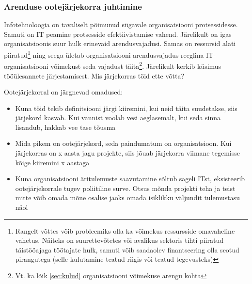 \documentclass{article}
\begin{document}
\subsubsection{Arenduse ootejärjekorra juhtimine}
Infotehnoloogia on tavaliselt põimunud sügavale organisatsiooni protsessidesse. Samuti on IT peamine protsesside efektiivistamise vahend. Järelikult on igas organisatsioonis suur hulk erinevaid arendusvajadusi. Samas on ressursid alati piiratud\footnote{Rangelt võttes võib probleemiks olla ka võimekus ressursside omavaheline vahetus. Näiteks on suurettevõtetes või avalikus sektoris tihti piiratud täistööajaga töötajate hulk, samuti võib saadaolev finantseering olla seotud pirangutega (selle kulutamine teatud riigis või teatud tegevusteks)} ning seega ületab organisatsiooni arendusvajadus reeglina IT-organisatsiooni võimekust seda vajadust täita\footnote{Vt. ka lõik \ref{sec:kulud} organisatsiooni võimekuse arengu kohta}. Järelikult kerkib küsimus tööülesannete järjestamisest. Mis järjekorras töid ette võtta?

Ootejärjekorral on järgnevad omadused:
\begin{itemize}
	\item Kuna töid tekib definitsiooni järgi kiiremini, kui neid täita suudetakse, siis järjekord kasvab. Kui vannist voolab vesi aeglasemalt, kui seda sinna lisandub, hakkab vee tase tõusma
	\item Mida pikem on ootejärjekord, seda paindumatum on organisatsioon. Kui järjekorras on x aasta jagu projekte, siis jõuab järjekorra viimane tegemisse kõige kiiremini x aastaga
	\item Kuna organisatsiooni äritulemuste saavutamine sõltub sageli ITst, eksisteerib ootejärjekorrale tugev poliitiline surve. Otsus mõnda projekti teha ja teist mitte võib omada mõne osalise jaoks omada isiklikku väljundit tulemustasu näol
\end{itemize}
\end{document}
